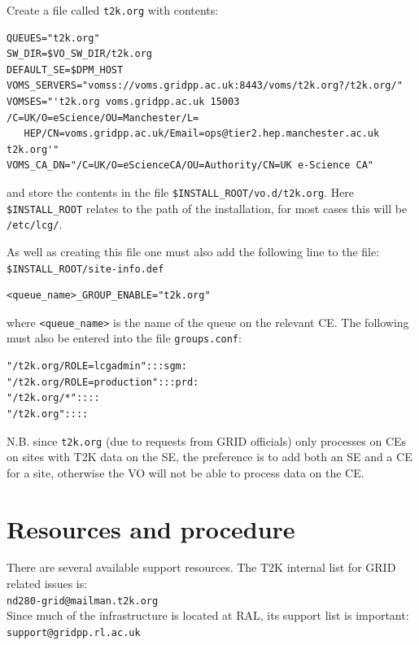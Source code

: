 \documentclass[11pt]{article}
\begin{document}
Create a file called \verb+t2k.org+ with contents:

\begin{verbatim}
QUEUES="t2k.org"
SW_DIR=$VO_SW_DIR/t2k.org
DEFAULT_SE=$DPM_HOST
VOMS_SERVERS="vomss://voms.gridpp.ac.uk:8443/voms/t2k.org?/t2k.org/"
VOMSES="'t2k.org voms.gridpp.ac.uk 15003 /C=UK/O=eScience/OU=Manchester/L=
   HEP/CN=voms.gridpp.ac.uk/Email=ops@tier2.hep.manchester.ac.uk t2k.org'"
VOMS_CA_DN="/C=UK/O=eScienceCA/OU=Authority/CN=UK e-Science CA"
\end{verbatim}

and store the contents in the file \verb+$INSTALL_ROOT/vo.d/t2k.org+. Here
\verb+$INSTALL_ROOT+ relates to the path of the installation, for most cases
this will be \verb+/etc/lcg/+.

As well as creating this file one must also add the following line to the file: 
\verb+$INSTALL_ROOT/site-info.def+

\begin{verbatim}
<queue_name>_GROUP_ENABLE="t2k.org"
\end{verbatim}

where \verb+<queue_name>+ is the name of the queue on the relevant CE. The following must also be entered into the file \verb+groups.conf+:

\begin{verbatim}
"/t2k.org/ROLE=lcgadmin":::sgm:
"/t2k.org/ROLE=production":::prd:
"/t2k.org/*"::::
"/t2k.org"::::
\end{verbatim}

N.B. since \verb+t2k.org+ (due to requests from GRID officials) only
processes on CEs on sites with T2K data on the SE, the preference is
to add both an SE and a CE for a site, otherwise the VO will not be
able to process data on the CE.


\clearpage
\section{Resources and procedure}
\label{sec:resources}

There are several available support resources. The T2K internal list
for GRID related issues is:\\
\verb+nd280-grid@mailman.t2k.org+\\
Since much of the infrastructure is located at RAL, its support list
is important:\\
\verb+support@gridpp.rl.ac.uk+
\end{document}
